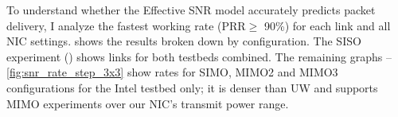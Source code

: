 \setcounter{figure}{0}
\begin{figure}
\begin{xtrafullpage}
	\centering	
	\setcounter{subfigure}{2}

	\vspace{36pt}
\end{xtrafullpage}
\end{figure}

To understand whether the Effective SNR model accurately predicts packet delivery, I analyze the fastest working rate (PRR$\geq$ 90\%) for each link and all NIC settings.  shows the results broken down by configuration. The SISO experiment () shows links for both testbeds combined. The remaining graphs --\ref{fig:snr_rate_step_3x3}  show rates for SIMO, MIMO2 and MIMO3 configurations for the Intel testbed only; it is denser than UW and supports MIMO experiments over our NIC's transmit power range.

